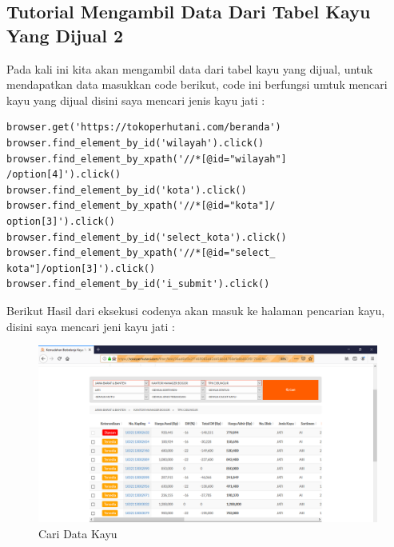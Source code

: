 \subsection{Tutorial Mengambil Data Dari Tabel Kayu Yang Dijual 2}
Pada kali ini kita akan mengambil data dari tabel kayu yang dijual, untuk mendapatkan data masukkan code berikut, code ini berfungsi umtuk mencari kayu yang dijual disini saya mencari jenis kayu jati :
\begin{verbatim}
browser.get('https://tokoperhutani.com/beranda')
browser.find_element_by_id('wilayah').click()
browser.find_element_by_xpath('//*[@id="wilayah"]
/option[4]').click()
browser.find_element_by_id('kota').click()
browser.find_element_by_xpath('//*[@id="kota"]/
option[3]').click()
browser.find_element_by_id('select_kota').click()
browser.find_element_by_xpath('//*[@id="select_
kota"]/option[3]').click()
browser.find_element_by_id('i_submit').click()
\end{verbatim}
Berikut Hasil dari eksekusi codenya akan masuk ke halaman pencarian kayu, disini saya mencari jeni kayu jati  :
\begin{figure}[h]
	\centering
	\includegraphics[scale=0.3]{figures/caridatakayu}
	\caption{Cari Data Kayu}
\end{figure}

